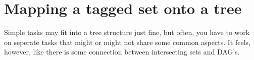 

\section{Mapping a tagged set onto a tree}
Simple tasks may fit into a tree structure just fine, but often, you have to work on seperate tasks that might or might not share some common aspects. It feels, however, like there is some connection between intersecting sets and DAG's. 

